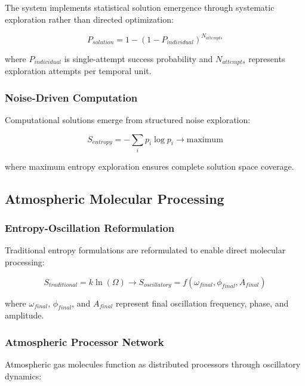 \documentclass[12pt,a4paper]{article}
\begin{document}
The system implements statistical solution emergence through systematic exploration rather than directed optimization:

\begin{equation}
P_{solution} = 1 - \left(1 - P_{individual}\right)^{N_{attempts}}
\end{equation}

where $P_{individual}$ is single-attempt success probability and $N_{attempts}$ represents exploration attempts per temporal unit.

\subsubsection{Noise-Driven Computation}

Computational solutions emerge from structured noise exploration:

\begin{equation}
S_{entropy} = -\sum_{i} p_i \log p_i \rightarrow \text{maximum}
\end{equation}

where maximum entropy exploration ensures complete solution space coverage.

\subsection{Atmospheric Molecular Processing}

\subsubsection{Entropy-Oscillation Reformulation}

Traditional entropy formulations are reformulated to enable direct molecular processing:

\begin{equation}
S_{traditional} = k \ln(\Omega) \rightarrow S_{oscillatory} = f(\omega_{final}, \phi_{final}, A_{final})
\end{equation}

where $\omega_{final}$, $\phi_{final}$, and $A_{final}$ represent final oscillation frequency, phase, and amplitude.

\subsubsection{Atmospheric Processor Network}

Atmospheric gas molecules function as distributed processors through oscillatory dynamics:
\end{document}
